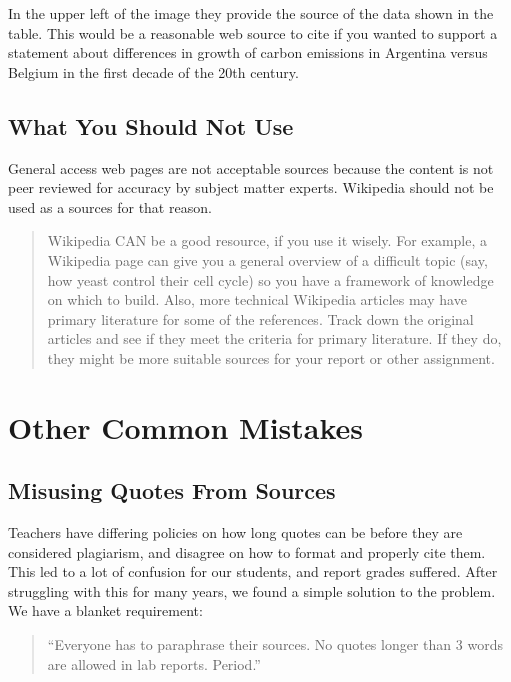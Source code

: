 \documentclass[
]{book}
\begin{document}
In the upper left of the image they provide the source of the data shown in the table. This would be a reasonable web source to cite if you wanted to support a statement about differences in growth of carbon emissions in Argentina versus Belgium in the first decade of the 20th century.

\hypertarget{what-you-should-not-use}{%
\subsection{What You Should Not Use}\label{what-you-should-not-use}}

General access web pages are not acceptable sources because the content is not peer reviewed for accuracy by subject matter experts. Wikipedia should not be used as a sources for that reason.

\begin{quote}
Wikipedia CAN be a good resource, if you use it wisely. For example, a Wikipedia page can give you a general overview of a difficult topic (say, how yeast control their cell cycle) so you have a framework of knowledge on which to build. Also, more technical Wikipedia articles may have primary literature for some of the references. Track down the original articles and see if they meet the criteria for primary literature. If they do, they might be more suitable sources for your report or other assignment.
\end{quote}

\hypertarget{other-common-mistakes}{%
\section{Other Common Mistakes}\label{other-common-mistakes}}

\hypertarget{misusing-quotes-from-sources}{%
\subsection{Misusing Quotes From Sources}\label{misusing-quotes-from-sources}}

Teachers have differing policies on how long quotes can be before they are considered plagiarism, and disagree on how to format and properly cite them. This led to a lot of confusion for our students, and report grades suffered. After struggling with this for many years, we found a simple solution to the problem. We have a blanket requirement:

\begin{quote}
``Everyone has to paraphrase their sources. No quotes longer than 3 words are allowed in lab reports. Period.''
\end{quote}
\end{document}
